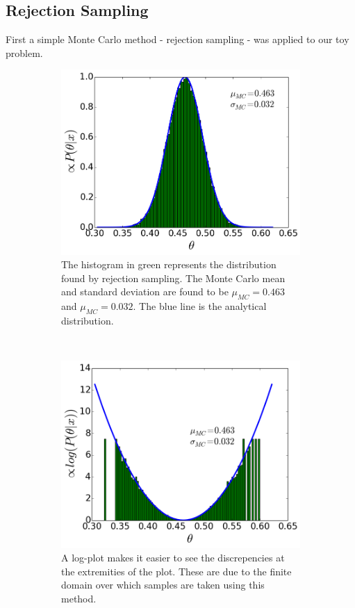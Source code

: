 \documentclass[a4paper,11pt,twoside]{article}
\begin{document}
\subsection{Rejection Sampling} 
First a simple Monte Carlo method - rejection sampling - was applied to our toy
problem.
\begin{figure}[ht]
	\centering
	\begin{subfigure}[t]{0.4\textwidth}
		\centering
		\includegraphics[width=\textwidth]{rejection.png}
		\caption{The histogram in green represents the distribution
			found by rejection sampling. The Monte Carlo mean and standard
			deviation are found to be $\mu_{MC} = 0.463$ and $\mu_{MC} = 0.032$.
			The blue line is the analytical distribution.}
		\label{fig:rejection}
	\end{subfigure}
	~
	\begin{subfigure}[t]{0.4\textwidth}
		\centering
		\includegraphics[width=\textwidth]{rejlog.png}
		\caption{A log-plot makes it easier to see the discrepencies at
			the extremities of the plot. These are due to the finite
		domain over which samples are taken using this method.}
		\label{fig:rejlog}
	\end{subfigure}
	\caption{}\label{fig:rejplots}
\end{figure}
\end{document}
